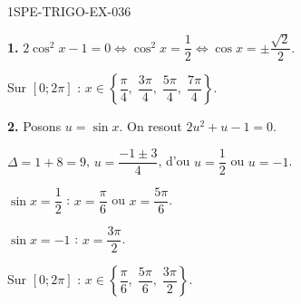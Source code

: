 \begin{corrige}{1SPE-TRIGO-EX-036}

\textbf{1.} $2\cos^2 x - 1 = 0 \iff \cos^2 x = \dfrac{1}{2} \iff \cos x = \pm\dfrac{\sqrt{2}}{2}$.

Sur $[0;2\pi]$ : $x \in \left\{\dfrac{\pi}{4},\;\dfrac{3\pi}{4},\;\dfrac{5\pi}{4},\;\dfrac{7\pi}{4}\right\}$.

\textbf{2.} Posons $u = \sin x$. On resout $2u^2 + u - 1 = 0$.

$\Delta = 1 + 8 = 9$, $u = \dfrac{-1 \pm 3}{4}$, d'ou $u = \dfrac{1}{2}$ ou $u = -1$.

$\sin x = \dfrac{1}{2}$ : $x = \dfrac{\pi}{6}$ ou $x = \dfrac{5\pi}{6}$.

$\sin x = -1$ : $x = \dfrac{3\pi}{2}$.

Sur $[0;2\pi]$ : $x \in \left\{\dfrac{\pi}{6},\;\dfrac{5\pi}{6},\;\dfrac{3\pi}{2}\right\}$.

\end{corrige}

